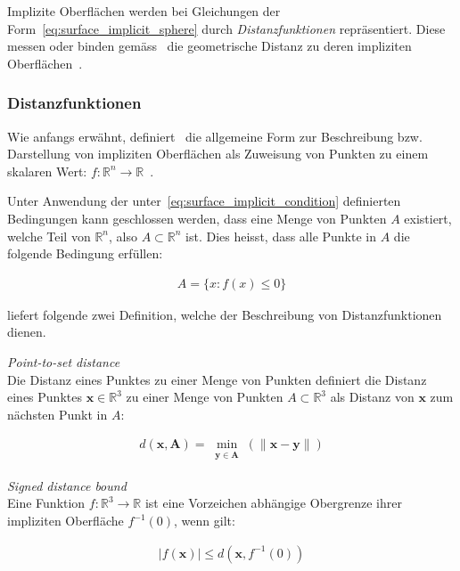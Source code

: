 Implizite Oberflächen werden bei Gleichungen der
Form~\ref{eq:surface_implicit_sphere} durch \textit{Distanzfunktionen}
repräsentiert. Diese messen oder binden
gemäss~\citeauthor{hart_sphere_1994} die geometrische Distanz zu deren
impliziten Oberflächen~\parencite[S. 529]{hart_sphere_1994}.

\subsubsection{Distanzfunktionen}
\label{ssubsec:distance_functions}

Wie anfangs erwähnt, definiert~\citeauthor{hart_sphere_1994} die
allgemeine Form zur Beschreibung bzw. Darstellung von impliziten
Oberflächen als Zuweisung von Punkten zu einem skalaren Wert: $ f :
\mathbb{R}^{n} \to \mathbb{R} $~\parencite[S. 527]{hart_sphere_1994}.

Unter Anwendung der unter~\autoref{eq:surface_implicit_condition}
definierten Bedingungen kann geschlossen werden, dass eine Menge von
Punkten $A$ existiert, welche Teil von $\mathbb{R}^{n}$, also $A \subset
\mathbb{R}^{n}$ ist. Dies heisst, dass alle Punkte in $A$ die folgende
Bedingung erfüllen:

\begin{gather}
    A = \{ x : f(x) \leq 0 \}
\end{gather}

\citeauthor{hart_sphere_1994} liefert folgende zwei Definition, welche der
Beschreibung von Distanzfunktionen dienen.

\theoremstyle{definition}
\begin{definition}{\label{theo:point_to_set_distance}
    \textit{Point-to-set distance}}\\
    Die Distanz eines Punktes zu einer Menge von Punkten definiert die Distanz
    eines Punktes $ \bm{x} \in \mathbb{R}^{3} $ zu einer Menge von Punkten $A
    \subset \mathbb{R}^{3}$ als Distanz von $\bm{x}$ zum nächsten Punkt in $A$:

    \begin{gather}
        d(\bm{x}, \bm{A}) = \min_{\substack{\bm{y} \in \bm{A}}}(\|\bm{x} - \bm{y}\|)
    \end{gather}
\end{definition}

\theoremstyle{definition}
\begin{definition}{\label{theo:signed_distnace_bound}
    \textit{Signed distance bound}}\\ 
    Eine Funktion $ f : \mathbb{R}^{3} \to \mathbb{R} $ ist eine
    Vorzeichen abhängige Obergrenze ihrer impliziten Oberfläche $ f^{-1}(0)$,
    wenn gilt:

    \begin{gather}\label{eq:signed_distnace_bound}
        |f(\bm{x})| \leq d(\bm{x}, f^{-1}(0))
    \end{gather}
\end{definition}

